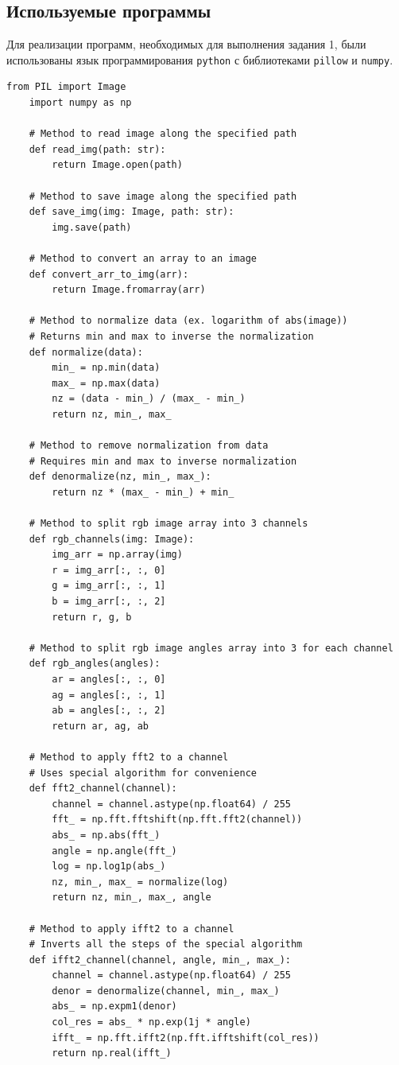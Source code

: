 \documentclass[a4paper, 12pt]{article}
\begin{document}
    \subsection{Используемые программы}
    Для реализации программ, необходимых для выполнения задания 1, были использованы язык программирования
    \texttt{python} с библиотеками \texttt{pillow} и \texttt{numpy}.
    \begin{lstlisting}[label=task1, caption={Программные методы, необходимые для задания 1}]
    from PIL import Image
    import numpy as np

    # Method to read image along the specified path
    def read_img(path: str):
        return Image.open(path)

    # Method to save image along the specified path
    def save_img(img: Image, path: str):
        img.save(path)

    # Method to convert an array to an image
    def convert_arr_to_img(arr):
        return Image.fromarray(arr)

    # Method to normalize data (ex. logarithm of abs(image))
    # Returns min and max to inverse the normalization
    def normalize(data):
        min_ = np.min(data)
        max_ = np.max(data)
        nz = (data - min_) / (max_ - min_)
        return nz, min_, max_
    
    # Method to remove normalization from data
    # Requires min and max to inverse normalization
    def denormalize(nz, min_, max_):
        return nz * (max_ - min_) + min_
    
    # Method to split rgb image array into 3 channels
    def rgb_channels(img: Image):
        img_arr = np.array(img)
        r = img_arr[:, :, 0]
        g = img_arr[:, :, 1]
        b = img_arr[:, :, 2]
        return r, g, b
    
    # Method to split rgb image angles array into 3 for each channel
    def rgb_angles(angles):
        ar = angles[:, :, 0]
        ag = angles[:, :, 1]
        ab = angles[:, :, 2]
        return ar, ag, ab

    # Method to apply fft2 to a channel
    # Uses special algorithm for convenience
    def fft2_channel(channel):
        channel = channel.astype(np.float64) / 255
        fft_ = np.fft.fftshift(np.fft.fft2(channel))
        abs_ = np.abs(fft_)
        angle = np.angle(fft_)
        log = np.log1p(abs_)
        nz, min_, max_ = normalize(log)
        return nz, min_, max_, angle
    
    # Method to apply ifft2 to a channel
    # Inverts all the steps of the special algorithm
    def ifft2_channel(channel, angle, min_, max_):
        channel = channel.astype(np.float64) / 255
        denor = denormalize(channel, min_, max_)
        abs_ = np.expm1(denor)
        col_res = abs_ * np.exp(1j * angle)
        ifft_ = np.fft.ifft2(np.fft.ifftshift(col_res))
        return np.real(ifft_)
    

\end{lstlisting}
\end{document}
